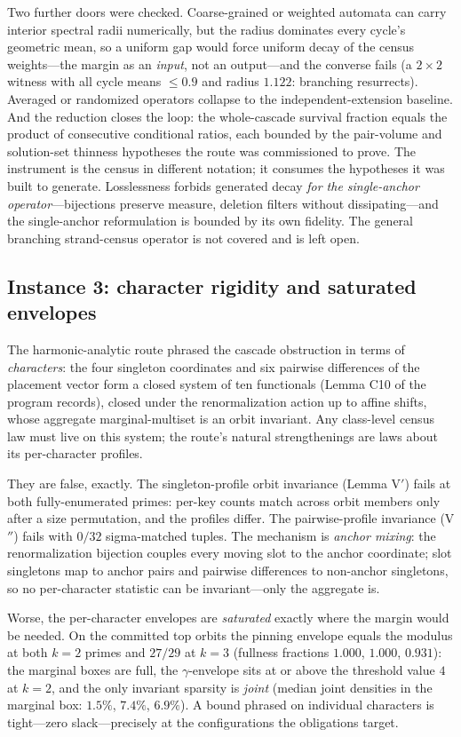 \documentclass[11pt,a4paper]{article}
\numberwithin{equation}{section}
\theoremstyle{plain}
\theoremstyle{definition}
\theoremstyle{remark}
\begin{document}
Two further doors were checked. Coarse-grained or weighted automata can
carry interior spectral radii numerically, but the radius dominates every
cycle's geometric mean, so a uniform gap would force uniform decay of the
census weights---the margin as an \emph{input}, not an output---and the
converse fails (a $2\times2$ witness with all cycle means $\le0.9$ and
radius $1.122$: branching resurrects). Averaged or randomized operators
collapse to the independent-extension baseline. And the reduction closes
the loop: the whole-cascade survival fraction equals the product of
consecutive conditional ratios, each bounded by the pair-volume and
solution-set thinness hypotheses the route was commissioned to prove. The
instrument is the census in different notation; it consumes the
hypotheses it was built to generate. Losslessness forbids generated
decay \emph{for the single-anchor operator}---bijections preserve
measure, deletion filters without dissipating---and the single-anchor
reformulation is bounded by its own fidelity. The general branching
strand-census operator is not covered and is left open.

\subsection{Instance 3: character rigidity and saturated envelopes}
\label{sec:tm-char}

The harmonic-analytic route phrased the cascade obstruction in terms of
\emph{characters}: the four singleton coordinates and six pairwise
differences of the placement vector form a closed system of ten
functionals (Lemma C10 of the program records), closed under the
renormalization action up to affine shifts, whose aggregate
marginal-multiset is an orbit invariant. Any class-level census law must
live on this system; the route's natural strengthenings are laws about
its per-character profiles.

They are false, exactly. The singleton-profile orbit invariance (Lemma
V$'$) fails at both fully-enumerated primes: per-key counts match across
orbit members only after a size permutation, and the profiles differ. The
pairwise-profile invariance (V$''$) fails with $0/32$ sigma-matched
tuples. The mechanism is \emph{anchor mixing}: the renormalization
bijection couples every moving slot to the anchor coordinate; slot
singletons map to anchor pairs and pairwise differences to non-anchor
singletons, so no per-character statistic can be invariant---only the
aggregate is.

Worse, the per-character envelopes are \emph{saturated} exactly where the
margin would be needed. On the committed top orbits the pinning envelope
equals the modulus at both $k=2$ primes and $27/29$ at $k=3$ (fullness
fractions $1.000$, $1.000$, $0.931$): the marginal boxes are full, the
$\gamma$-envelope sits at or above the threshold value $4$ at $k=2$, and
the only invariant sparsity is \emph{joint} (median joint densities in
the marginal box: $1.5\%$, $7.4\%$, $6.9\%$). A bound phrased on
individual characters is tight---zero slack---precisely at the
configurations the obligations target.
\end{document}
